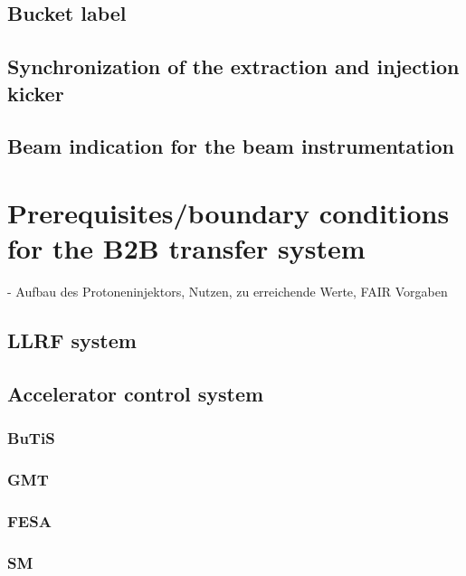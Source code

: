 \subsection{Bucket label}
\subsection{Synchronization of the extraction and injection kicker}
\subsection{Beam indication for the beam instrumentation}


\section{Prerequisites/boundary conditions for the B2B transfer system}
- Aufbau des Protoneninjektors, Nutzen, zu erreichende Werte, FAIR Vorgaben
\subsection{LLRF system}
\subsection{Accelerator control system}
\subsubsection{BuTiS}
\subsubsection{GMT}
\subsubsection{FESA}
\subsubsection{SM}


